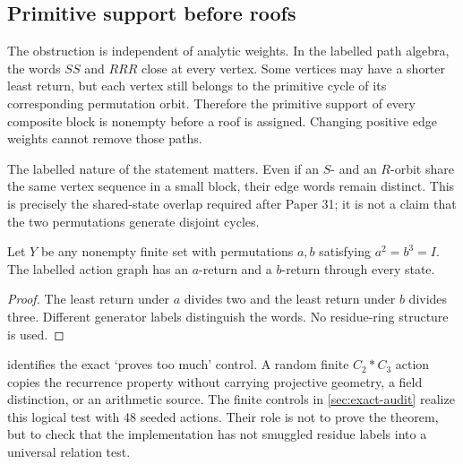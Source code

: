 \subsection{Primitive support before roofs}

The obstruction is independent of analytic weights.  In the labelled path
algebra, the words $SS$ and $RRR$ close at every vertex.  Some vertices may
have a shorter least return, but each vertex still belongs to the primitive
cycle of its corresponding permutation orbit.  Therefore the primitive
support of every composite block is nonempty before a roof is assigned.
Changing positive edge weights cannot remove those paths.

The labelled nature of the statement matters.  Even if an $S$- and an
$R$-orbit share the same vertex sequence in a small block, their edge words
remain distinct.  This is precisely the shared-state overlap required after
Paper 31; it is not a claim that the two permutations generate disjoint
cycles.

\begin{proposition}
\label{prop:generic-compiler}
Let $Y$ be any nonempty finite set with permutations $a,b$ satisfying
$a^2=b^3=I$.  The labelled action graph has an $a$-return and a $b$-return
through every state.
\end{proposition}

\begin{proof}
The least return under $a$ divides two and the least return under $b$ divides
three.  Different generator labels distinguish the words.  No residue-ring
structure is used.
\end{proof}

 identifies the exact `proves too much' control.
A random finite $C_2*C_3$ action copies the recurrence property without
carrying projective geometry, a field distinction, or an arithmetic source.
The finite controls in \cref{sec:exact-audit} realize this logical test with
48 seeded actions.  Their role is not to prove the theorem, but to check that
the implementation has not smuggled residue labels into a universal relation
test.

